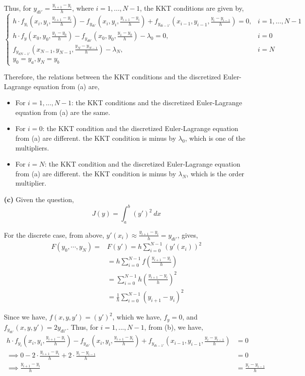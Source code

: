\documentclass[12pt]{article}
\begin{document}
Thus, for $y_{di'} = \frac{y_{i+1} - y_{i}}{h}$, where $i = 1, ..., N-1$, the KKT conditions are given by, 
$$
\begin{cases}
	h \cdot f_{y_i}(x_i, y_i, \frac{y_{i+1} - y_i}{h}) - f_{y_{di'}}(x_i, y_i, \frac{y_{i+1} - y_i}{h}) +  f_{y_{di-1'}}(x_{i-1}, y_{i-1}, \frac{y_i - y_{i-1}}{h}) = 0, & i = 1, ..., N-1\\
	h \cdot f_y(x_0, y_0, \frac{y_1 - y_0}{h}) - f_{y_{d0'}}(x_0, y_0, \frac{y_1 - y_0}{h}) - \lambda_0 =0, & i=0\\
	f_{y_{dN-1'}}(x_{N-1}, y_{N-1}, \frac{y_N - y_{N-1}}{h}) - \lambda_N, & i=N \\
	y_0=y_a, y_N=y_b 
\end{cases}
$$

Therefore, the relations between the KKT conditions and the discretized Euler-Lagrange equation from (a) are, 
\begin{itemize}
	\item For $i = 1, ..., N-1$: the KKT conditions and the discretized Euler-Lagrange equation from (a) are the same.
	\item For $i = 0$: the KKT condition and the discretized Euler-Lagrange equation from (a) are different. the KKT condition is minus by $\lambda_0$, which is one of the multipliers.
	\item For $i = N$: the KKT condition and the discretized Euler-Lagrange equation from (a) are different. the KKT condition is minus by $\lambda_N$, which is the order multiplier.
\end{itemize}

\vspace{10pt}
\noindent
\textbf{(c)} 
Given the question, 
$$J(y)=\int_a^b (y')^2\ dx$$

For the discrete case, from above,  $y'(x_i)\approx\frac{y_{i+1}-y_i}{h} = y_{di'}$, gives, 
\begin{align*}
	F(y_0, \cdots, y_N) =& F(y') = h \sum_{i=0}^{N-1} (y'(x_i))^2 \\
	&= h \sum_{i=0}^{N-1} f(\frac{y_{i+1} - y_i}{h}) \\
	&=\sum_{i=0}^{N-1} h\left(\frac{y_{i+1}-y_i}{h}\right)^2 \\
	&=\frac{1}{h}\sum_{i=0}^{N-1}(y_{i+1}-y_i)^2
\end{align*}

Since we have, $f(x,y,y')=(y')^2$, which we have, $f_y = 0$, and $f_{y_{di'}}(x,y,y')=2y_{di'}$. Thus, for $i = 1, ..., N-1$, from (b), we have, 
\begin{align*}
	h \cdot f_{y_i}(x_i, y_i, \frac{y_{i+1} - y_i}{h}) - f_{y_{di'}}(x_i, y_i, \frac{y_{i+1} - y_i}{h}) +  f_{y_{di-1'}}(x_{i-1}, y_{i-1}, \frac{y_i - y_{i-1}}{h}) &= 0 \\
	\implies 0 - 2 \cdot \frac{y_{i+1} - y_i}{h} + 2 \cdot  \frac{y_i - y_{i-1}}{h} &= 0 \\
	\implies \frac{y_{i+1} - y_i}{h} &= \frac{y_i - y_{i-1}}{h}
\end{align*}
\end{document}
